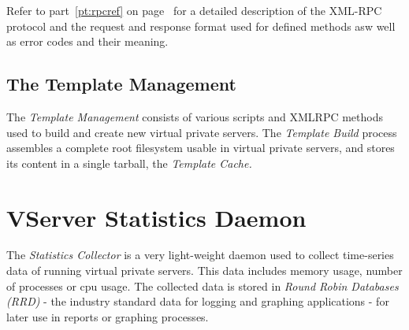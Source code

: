 Refer to part~\ref{pt:rpcref} on page~\pageref{pt:rpcref} for a detailed
description of the XML-RPC protocol and the request and response format used
for defined methods asw well as error codes and their meaning.


\subsection{The Template Management}

The \emph{Template Management} consists of various scripts and XMLRPC methods
used to build and create new virtual private servers. The \emph{Template Build}
process assembles a complete root filesystem usable in virtual private servers,
and stores its content in a single tarball, the \emph{Template Cache.}


\section{VServer Statistics Daemon}
\label{sec:intro:vcd:vstatd}

The \emph{Statistics Collector} is a very light-weight daemon used to collect
time-series data of running virtual private servers. This data includes memory
usage, number of processes or cpu usage. The collected data is stored in
\emph{Round Robin Databases (RRD)} - the industry standard data for logging and
graphing applications - for later use in reports or graphing processes.

